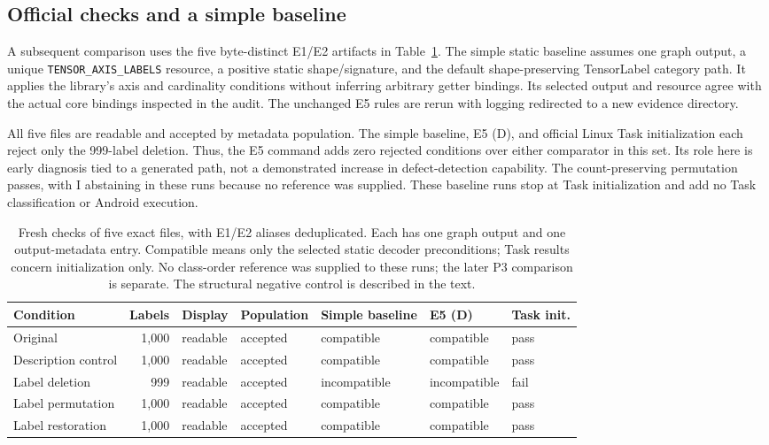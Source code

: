 \documentclass[10pt,twocolumn,letterpaper]{article}
\newcommand{\code}[1]{\texttt{#1}}
\begin{document}
\subsection{Official checks and a simple baseline}
A subsequent comparison uses the five byte-distinct E1/E2 artifacts in Table~\ref{tab:baseline}. The simple static baseline assumes one graph output, a unique \code{TENSOR\_AXIS\_LABELS} resource, a positive static shape/signature, and the default shape-preserving TensorLabel category path. It applies the library's axis and cardinality conditions without inferring arbitrary getter bindings. Its selected output and resource agree with the actual core bindings inspected in the audit. The unchanged E5 rules are rerun with logging redirected to a new evidence directory.

All five files are readable and accepted by metadata population. The simple baseline, E5 (D), and official Linux Task initialization each reject only the 999-label deletion. Thus, the E5 command adds zero rejected conditions over either comparator in this set. Its role here is early diagnosis tied to a generated path, not a demonstrated increase in defect-detection capability. The count-preserving permutation passes, with I abstaining in these runs because no reference was supplied. These baseline runs stop at Task initialization and add no Task classification or Android execution.

\begin{table}[t]
\centering\small
\setlength{\tabcolsep}{7pt}
\begin{tabular}{@{}lrlllll@{}}
\toprule
Condition & Labels & Display & Population & Simple baseline & E5 (D) & Task init.\\
\midrule
Original & 1,000 & readable & accepted & compatible & compatible & pass\\
Description control & 1,000 & readable & accepted & compatible & compatible & pass\\
Label deletion & 999 & readable & accepted & incompatible & incompatible & fail\\
Label permutation & 1,000 & readable & accepted & compatible & compatible & pass\\
Label restoration & 1,000 & readable & accepted & compatible & compatible & pass\\
\bottomrule
\end{tabular}
\caption{Fresh checks of five exact files, with E1/E2 aliases deduplicated. Each has one graph output and one output-metadata entry. Compatible means only the selected static decoder preconditions; Task results concern initialization only. No class-order reference was supplied to these runs; the later P3 comparison is separate. The structural negative control is described in the text.}
\label{tab:baseline}
\end{table}
\end{document}
